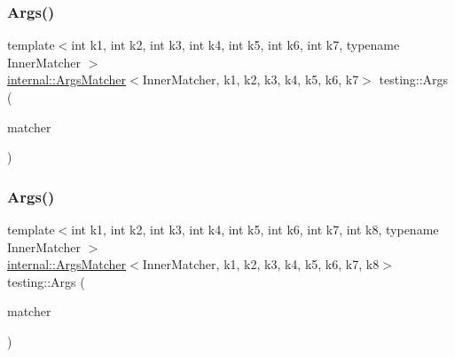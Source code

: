 \mbox{\label{namespacetesting_a9a9ef7a866b397430527076e342817f9}} 
\subsubsection{\texorpdfstring{Args()}{Args()}\hspace{0.1cm}{\footnotesize\ttfamily [8/11]}}
{\footnotesize\ttfamily template$<$int k1, int k2, int k3, int k4, int k5, int k6, int k7, typename Inner\+Matcher $>$ \\
\mbox{\hyperlink{classtesting_1_1internal_1_1ArgsMatcher}{internal\+::\+Args\+Matcher}}$<$Inner\+Matcher, k1, k2, k3, k4, k5, k6, k7$>$ testing\+::\+Args (\begin{DoxyParamCaption}\item[{const Inner\+Matcher \&}]{matcher }\end{DoxyParamCaption})\hspace{0.3cm}{\ttfamily [inline]}}

\mbox{\label{namespacetesting_ae8a4e8e1b8eb87c9f1e5f02519da7fce}} 
\subsubsection{\texorpdfstring{Args()}{Args()}\hspace{0.1cm}{\footnotesize\ttfamily [9/11]}}
{\footnotesize\ttfamily template$<$int k1, int k2, int k3, int k4, int k5, int k6, int k7, int k8, typename Inner\+Matcher $>$ \\
\mbox{\hyperlink{classtesting_1_1internal_1_1ArgsMatcher}{internal\+::\+Args\+Matcher}}$<$Inner\+Matcher, k1, k2, k3, k4, k5, k6, k7, k8$>$ testing\+::\+Args (\begin{DoxyParamCaption}\item[{const Inner\+Matcher \&}]{matcher }\end{DoxyParamCaption})\hspace{0.3cm}{\ttfamily [inline]}}

\mbox{\label{namespacetesting_a62c877e01fb9098cd3c399f921bf4e3e}} 
